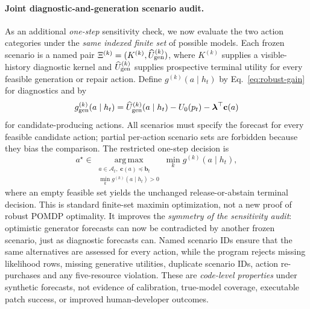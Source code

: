 \documentclass[pdflatex,sn-basic]{sn-jnl}
\begin{document}
\paragraph{Joint diagnostic-and-generation scenario audit.}
As an additional \emph{one-step} sensitivity check,
we now evaluate the two action categories under
the \emph{same indexed finite set} of possible
models. Each frozen scenario is a named pair
$\Xi^{(k)}=(K^{(k)},\widehat U_{\rm gen}^{(k)})$,
where $K^{(k)}$ supplies a visible-history
diagnostic kernel and $\widehat U_{\rm gen}^{(k)}$
supplies prospective terminal utility for every
feasible generation or repair action. Define
$g^{(k)}(a\mid h_t)$ by Eq.~\eqref{eq:robust-gain}
for diagnostics and by
\begin{equation}
 g^{(k)}_{\rm gen}(a\mid h_t)
 =\widehat U_{\rm gen}^{(k)}(a\mid h_t)
 -U_0(p_t)-\boldsymbol\lambda^\top\mathbf c(a)
 \label{eq:joint-scenario-generator}
\end{equation}
for candidate-producing actions. All scenarios
must specify the forecast for every feasible
candidate action; partial per-action scenario
sets are forbidden because they bias the comparison.
The restricted one-step decision is
\begin{equation}
 a^\star\in
 \underset{\substack{a\in\mathcal A_t,\;
       \mathbf c(a)\preceq\mathbf b_t\\
       \min_{k}g^{(k)}(a\mid h_t)>0}}
 {\operatorname{arg\,max}}
 \min_{k}g^{(k)}(a\mid h_t),
 \label{eq:joint-scenario-allocation}
\end{equation}
where an empty feasible set yields the
unchanged release-or-abstain terminal decision.
This is standard finite-set maximin optimization,
not a new proof of robust POMDP optimality.
It improves the \emph{symmetry of the sensitivity
audit}: optimistic generator forecasts can now
be contradicted by another frozen scenario,
just as diagnostic forecasts can. Named scenario
IDs ensure that the same alternatives are assessed
for every action, while the program rejects
missing likelihood rows, missing generative
utilities, duplicate scenario IDs, action
re-purchases and any five-resource violation.
These are \emph{code-level properties} under
synthetic forecasts, not evidence of calibration,
true-model coverage, executable patch success,
or improved human-developer outcomes.
\end{document}
